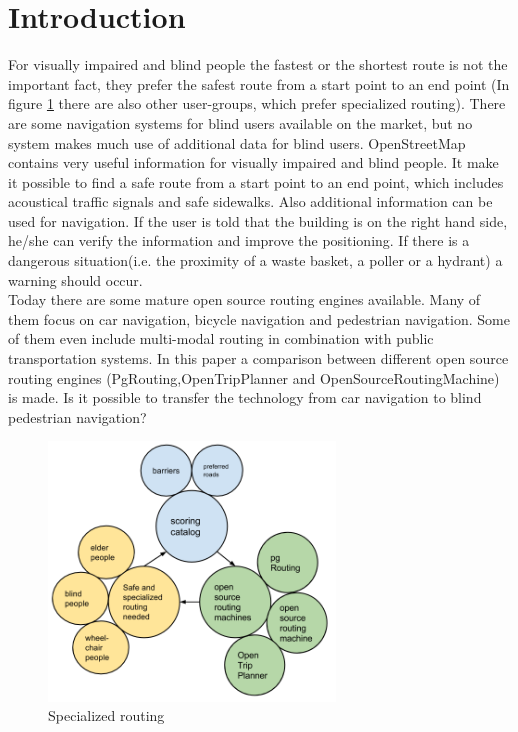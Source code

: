 \documentclass{sig-alternate}
\begin{document}

\section{Introduction}
For visually impaired and blind people the fastest or the shortest route is not the important fact, they prefer the safest route from a start point to an end point (In figure \ref{fig:pons} there are also other user-groups, which prefer specialized routing). There are some navigation systems for blind users available on the market, but no system makes much use of additional data for blind users. 
OpenStreetMap contains very useful information for visually impaired and blind people. It make it possible to find a safe route from a start point to an end point, which includes acoustical traffic signals and safe sidewalks. Also additional information can be used for navigation. If the user is told that the building is on the right hand side, he/she can verify the information and improve the positioning. If there is a dangerous situation(i.e. the proximity of a waste basket, a poller or a hydrant) a warning should occur. \\ 
Today there are some mature open source routing engines available. Many of them focus on car navigation, bicycle navigation and pedestrian navigation. Some of them even include multi-modal routing in combination with public transportation systems. In this paper a comparison between different open source routing engines (PgRouting,OpenTripPlanner and OpenSourceRoutingMachine) is made. Is it possible to transfer the technology from car navigation to blind pedestrian navigation?

\begin{figure}
\centering
\includegraphics[width=3in]{PONS-Routing-Overview.png}
\caption{Specialized routing}
\label{fig:pons}
\end{figure}
\end{document}

